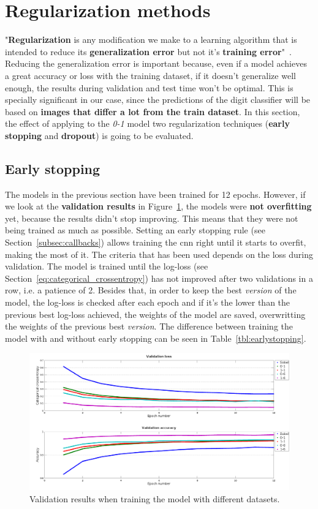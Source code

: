 \section{Regularization methods}
"\textbf{Regularization} is any modification we make to a learning algorithm that is intended to reduce its \textbf{generalization error} but not it's \textbf{training error}"~\cite{Goodfellow-et-al-2016}. Reducing the generalization error is important because, even if a model achieves a great accuracy or loss with the training dataset, if it doesn't generalize well enough, the results during validation and test time won't be optimal. This is specially significant in our case, since the predictions of the digit classifier will be based on \textbf{images that differ a lot from the train dataset}. In this section, the effect of applying to the \textit{0-1} model two regularization techniques (\textbf{early stopping} and \textbf{dropout}) is going to be evaluated. 

\subsection{Early stopping}\label{subsec:early_stopping}
The models in the previous section have been trained for 12 epochs. However, if we look at the \textbf{validation results} in Figure~\ref{fig:val_datasets}, the models were \textbf{not overfitting} yet, because the results didn't stop improving. This means that they were not being trained as much as possible. Setting an early stopping rule (see Section~\ref{subsec:callbacks}) allows training the \gls{cnn} right until it starts to overfit, making the most of it. The criteria that has been used depends on the loss during validation. The model is trained until the log-loss (see Section~\ref{eq:categorical_crossentropy}) has not improved after two validations in a row, i.e. a patience of 2. Besides that, in order to keep the best \textit{version} of the model, the log-loss is checked after each epoch and if it's the lower than the previous best log-loss achieved, the weights of the model are saved, overwritting the weights of the previous best \textit{version}. The difference between training the model with and without early stopping can be seen in Table~\ref{tbl:earlystopping}.
\begin{figure}
	\centering
	\includegraphics[width=1\linewidth, keepaspectratio]{figures/val_datasets.png}
	\caption{Validation results when training the model with different datasets.}
	\label{fig:val_datasets}
\end{figure}

